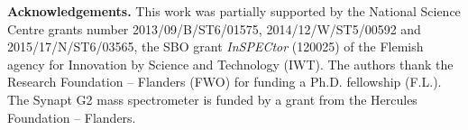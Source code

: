 \documentclass{llncs}
\begin{document}
{\textbf{Acknowledgements.}
        This work was partially supported by the National Science Centre grants number 2013/09/B/ST6/01575, 2014/12/W/ST5/00592 and 2015/17/N/ST6/03565, the SBO grant \textit{InSPECtor} (120025) of the Flemish agency for Innovation by Science and Technology (IWT). The authors thank the Research Foundation – Flanders (FWO) for funding a Ph.D. fellowship (F.L.). The Synapt G2 mass spectrometer is funded by a grant from the Hercules Foundation – Flanders.}

{\tiny}
\end{document}
